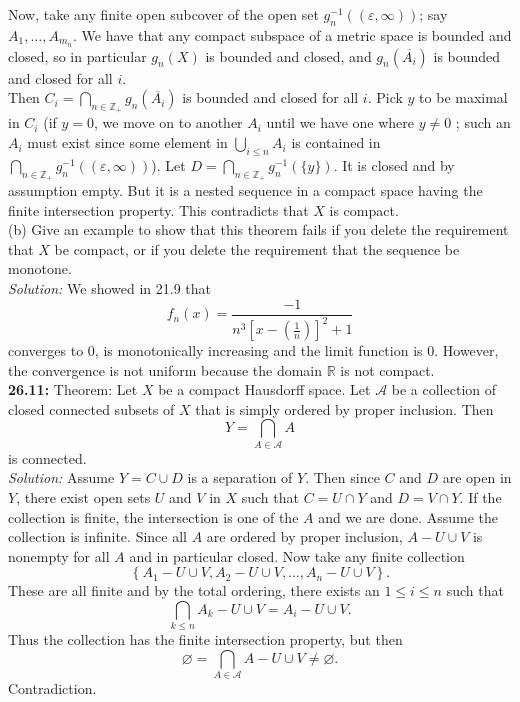 \documentclass[a4paper]{article}
\begin{document}
        Now, take any finite open subcover of the open set
        $g_n^{-1}\left( \left( \varepsilon, \infty \right)  \right) $; say
        $A_1, \ldots, A_{m_n}$.  We have that any compact subspace of a metric
        space is bounded and closed, so in particular
        $g_n \left( X \right) $ is bounded and closed, and
        $g_n \left( \overline{A_i} \right) $ is bounded and closed for all
        $i$.\\
        Then $C_i = \bigcap_{n \in \mathbb{Z}_+} g_n \left( \overline{A_i} \right)
        $ is bounded and closed for all $i$.
        Pick $y$ to be maximal in $C_i$ (if $y=0$, we move on to another $A_i$ 
        until we have one where $y\neq 0$ ; such an $A_i$ must exist since some
        element in $\bigcup_{i\le n} A_i$ is contained in $\bigcap_{n \in
        \mathbb{Z}_+} g_n^{-1}\left( \left( \varepsilon, \infty \right)  \right)
        $). Let
        $D = \bigcap_{n \in \mathbb{Z}_+} g_n^{-1}(\{y\})$. It is closed and
        by assumption empty. But it is a nested sequence in a compact space
        having the finite intersection property. This contradicts that $X$ is
        compact.\\
        \linebreak
        (b) Give an example to show that this theorem fails if you delete the
        requirement that $X$ be compact, or if you delete the requirement that
        the sequence be monotone.\\
        \textit{Solution:} We showed in 21.9 that
        \[
            f_n (x) = \frac{-1}{n^3 [x - \left( \frac{1}{n} \right) ]^2 +1 }
        \] 
        converges to $0$, is monotonically increasing and the limit function is
        $0$. However, the convergence is not uniform because the domain
        $\mathbb{R}$ is not compact.\\

        \textbf{26.11:} Theorem: Let $X$ be a compact Hausdorff space. Let
        $\mathcal{A}$ be a collection of closed connected subsets of $X$ that
        is simply ordered by proper inclusion. Then
        \[
        Y = \bigcap_{A \in \mathcal{A}} A
        \] 
        is connected.\\
        \linebreak
        \textit{Solution:} Assume $Y = C \cup D$ is a separation of $Y$.
        Then since $C$ and $D$ are open in $Y$, there exist open sets
        $U$ and $V$ in $X$ such that $C = U \cap Y$ and $D=V \cap Y$.
        If the collection is finite, the intersection is one of the $A$ and we
        are done. Assume the collection is infinite. 
        Since all  $A$ are ordered by proper inclusion,
        $A - U \cup V$ is nonempty for all $A$ and in particular closed. Now
        take any finite collection
         \[
        \left\{ A_1 - U\cup V, A_2 - U\cup V, \ldots, A_n - U\cup V \right\}.
        \] 
        These are all finite and by the total ordering, there exists an $1\le
        i\le n$ such that
        \[
        \bigcap_{k\le n} A_k - U\cup V = A_i - U \cup V.
        \] 
        Thus the collection has the finite intersection property, but then
        \[
            \varnothing = \bigcap_{A \in \mathcal{A}} A - U\cup V \neq
            \varnothing.
        \] 
        Contradiction.
\end{document}
